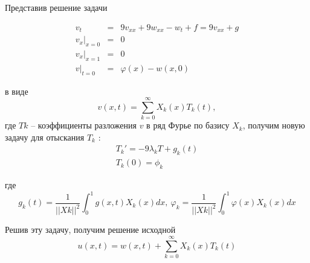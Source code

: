 \documentclass[a4paper,11pt]{article}
\begin{document}
Представив решение задачи

  \begin{equation}\label{eq:problv}
  \begin{array}{lll}
    v_t  & = &  9v_{xx} + 9w_{xx} - w_t + f = 9v_{xx} + g \\
    v_x|_{x=0}& = & 0 \\
    v_x|_{x=1} & = &0\\
    v|_{t=0}   & =  &\varphi(x) - w(x, 0)
  \end{array}
  \end{equation}

в виде
\[ v(x, t) = \sum_{k=0}^{\infty} X_k(x) T_k(t), \]
где $Tk$ -- коэффициенты разложения $v$ в ряд Фурье по базису $X_k$, получим новую задачу для отыскания $T_k$ :
\begin{equation}
  \begin{array}{l}
  T_k' = -9\lambda_k T + g_k(t) \\
  T_k(0) = \phi_k
  \end{array}
\end{equation}

 где
 \[ g_k(t) = \frac{1}{||Xk||^2}\int_0^1 g(x, t) X_k(x) dx, ~ \varphi_k = \frac{1}{||Xk||^2}\int_0^1 \varphi(x) X_k(x) dx \]


 Решив эту задачу, получим решение исходной
 \[ u(x, t) = w(x, t) + \sum_{k=0}^\infty X_k(x) T_k(t)\]
\end{document}
